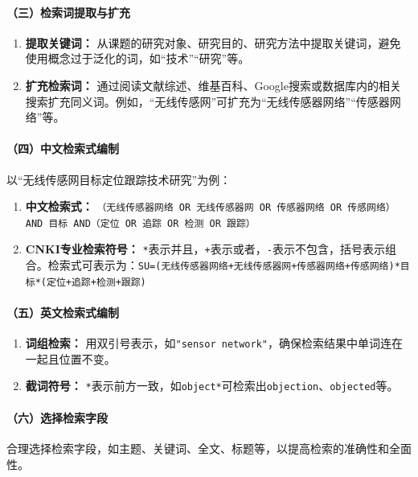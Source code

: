 \paragraph{（三）检索词提取与扩充}

\begin{enumerate}
  \item \textbf{提取关键词：} 从课题的研究对象、研究目的、研究方法中提取关键词，避免使用概念过于泛化的词，如“技术”“研究”等。
  \item \textbf{扩充检索词：} 通过阅读文献综述、维基百科、Google搜索或数据库内的相关搜索扩充同义词。例如，“无线传感网”可扩充为“无线传感器网络”“传感器网络”等。
\end{enumerate}

\paragraph{（四）中文检索式编制}

以“无线传感网目标定位跟踪技术研究”为例：

\begin{enumerate}
  \item \textbf{中文检索式：} \texttt{（无线传感器网络 OR 无线传感器网 OR 传感器网络 OR 传感网络） AND 目标 AND（定位 OR 追踪 OR 检测 OR 跟踪）}
  \item \textbf{CNKI专业检索符号：} \texttt{*}表示并且，\texttt{+}表示或者，\texttt{-}表示不包含，括号表示组合。检索式可表示为：\texttt{SU=(无线传感器网络+无线传感器网+传感器网络+传感网络)*目标*(定位+追踪+检测+跟踪)}
\end{enumerate}

\paragraph{（五）英文检索式编制}

\begin{enumerate}
  \item \textbf{词组检索：} 用双引号表示，如\texttt{"sensor network"}，确保检索结果中单词连在一起且位置不变。
  \item \textbf{截词符号：} \texttt{*}表示前方一致，如\texttt{object*}可检索出\texttt{objection}、\texttt{objected}等。
\end{enumerate}

\paragraph{（六）选择检索字段}

合理选择检索字段，如主题、关键词、全文、标题等，以提高检索的准确性和全面性。

